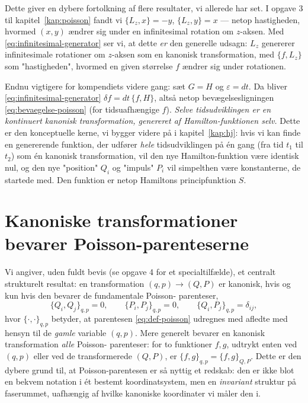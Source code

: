\begin{bemaerkning}
Dette giver en dybere fortolkning af flere resultater, vi allerede har
set. I opgave 3 til kapitel~\ref{kap:poisson} fandt vi
$\{L_z,x\}=-y$, $\{L_z,y\}=x$ — netop hastigheden, hvormed $(x,y)$
ændrer sig under en infinitesimal rotation om $z$-aksen. Med
\eqref{eq:infinitesimal-generator} ser vi, at dette \emph{er} den
generelle udsagn: $L_z$ genererer infinitesimale rotationer om
$z$-aksen som en kanonisk transformation, med $\{f,L_z\}$ som "hastigheden",
hvormed en given størrelse $f$ ændrer sig under rotationen.

Endnu vigtigere for kompendiets videre gang: sæt $G=H$ og
$\varepsilon = dt$. Da bliver \eqref{eq:infinitesimal-generator}
$\delta f = dt\,\{f,H\}$, altså netop bevægelsesligningen
\eqref{eq:bevaegelse-poisson} (for tidsuafhængige $f$). \emph{Selve
tidsudviklingen er en kontinuert kanonisk transformation, genereret af
Hamilton-funktionen selv.} Dette er den konceptuelle kerne, vi bygger
videre på i kapitel~\ref{kap:hj}: hvis vi kan finde en genererende
funktion, der udfører \emph{hele} tidsudviklingen på én gang (fra
tid $t_1$ til $t_2$) som én kanonisk transformation, vil den nye
Hamilton-funktion være identisk nul, og den nye "position" $Q_i$ og
"impuls" $P_i$ vil simpelthen være konstanterne, de startede med. Den
funktion er netop Hamiltons principfunktion $S$.
\end{bemaerkning}

\section{Kanoniske transformationer bevarer Poisson-parenteserne}

Vi angiver, uden fuldt bevis (se opgave 4 for et specialtilfælde), et
centralt strukturelt resultat: en transformation $(q,p)\to(Q,P)$ er
kanonisk, hvis og kun hvis den bevarer de fundamentale Poisson-
parenteser,
\begin{equation}
  \{Q_i,Q_j\}_{q,p} = 0, \qquad \{P_i,P_j\}_{q,p} = 0, \qquad \{Q_i,P_j\}_{q,p} = \delta_{ij},
  \label{eq:kanonisk-poisson-betingelse}
\end{equation}
hvor $\{\cdot,\cdot\}_{q,p}$ betyder, at parentesen \eqref{eq:def-poisson}
udregnes med afledte med hensyn til de \emph{gamle} variable $(q,p)$.
Mere generelt bevarer en kanonisk transformation \emph{alle} Poisson-
parenteser: for to funktioner $f,g$, udtrykt enten ved $(q,p)$ eller
ved de transformerede $(Q,P)$, er $\{f,g\}_{q,p}=\{f,g\}_{Q,P}$. Dette
er den dybere grund til, at Poisson-parentesen er så nyttig et
redskab: den er ikke blot en bekvem notation i ét bestemt
koordinatsystem, men en \emph{invariant} struktur på faserummet,
uafhængig af hvilke kanoniske koordinater vi måler den i.

